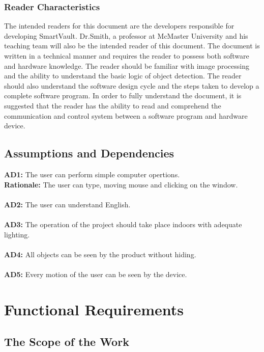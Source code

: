 \documentclass[12pt]{article}
\begin{document}
\subsubsection{Reader Characteristics}
The intended readers for this document are the developers responsible for developing SmartVault. Dr.Smith, a professor at McMaster University and his teaching team will also be the intended reader of this document. The document is written in a technical manner and requires the reader to possess both software and hardware knowledge. The reader should be familiar with image processing and the ability to understand the basic logic of object detection. The reader should also understand the software design cycle and the steps taken to develop a complete software program. In order to fully understand the document, it is suggested that the reader has the ability to read and comprehend the communication and control system between a software program and hardware device. 
\subsection{Assumptions and Dependencies}
\textbf{AD1:} The user can perform simple computer opertions.\\
\textbf{Rationale:} The user can type, moving mouse and clicking on the window.\\\\
\textbf{AD2:} The user can understand English.\\\\
\textbf{AD3:} The operation of the project should take place indoors with adequate lighting.\\\\
\textbf{AD4:} All objects can be seen by the product without hiding.\\\\
\textbf{AD5:} Every motion of the user can be seen by the device. 
\section{Functional Requirements}


\subsection{The Scope of the Work}
\end{document}
